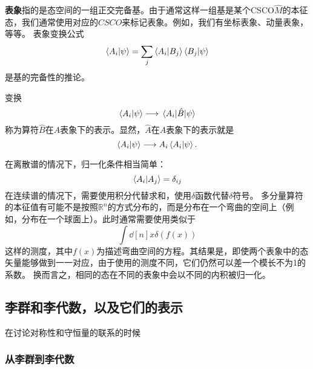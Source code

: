 \documentclass[hyperref, UTF8, a4paper]{ctexart}
\newcommand*{\reals}{\mathbb{R}}
\begin{document}

\textbf{表象}指的是态空间的一组正交完备基。由于通常这样一组基是某个CSCO$\hat{M}$的本征态，我们通常使用对应的$CSCO$来标记表象。例如，我们有坐标表象、动量表象，等等。
表象变换公式
\begin{equation}
    \braket{A_i}{\psi} = \sum_j \braket{A_i}{B_j} \braket{B_j}{\psi}
\end{equation}
是基的完备性的推论。

变换
\[
    \braket{A_i}{\psi} \longrightarrow \mel{A_i}{\hat{B}}{\psi}
\]
称为算符$\hat{B}$在$A$表象下的表示。显然，$\hat{A}$在$A$表象下的表示就是
\[
    \braket{A_i}{\psi} \longrightarrow A_i \braket{A_i}{\psi}.
\]

在离散谱的情况下，归一化条件相当简单：
\[
    \braket{A_i}{A_j} = \delta_{ij}
\]
在连续谱的情况下，需要使用积分代替求和，使用$\delta$函数代替$\delta$符号。
多分量算符的本征值有可能不是按照$\reals^n$的方式分布的，而是分布在一个弯曲的空间上（例如，分布在一个球面上）。此时通常需要使用类似于
\[
    \int \dd[n]{x} \delta(f(x))
\]
这样的测度，其中$f(x)$为描述弯曲空间的方程。其结果是，即使两个表象中的态矢量能够做到一一对应，由于使用的测度不同，它们仍然可以差一个模长不为1的系数。
换而言之，相同的态在不同的表象中会以不同的内积被归一化。

\subsection{李群和李代数，以及它们的表示}
在讨论对称性和守恒量的联系的时候

\subsubsection{从李群到李代数}
\end{document}
